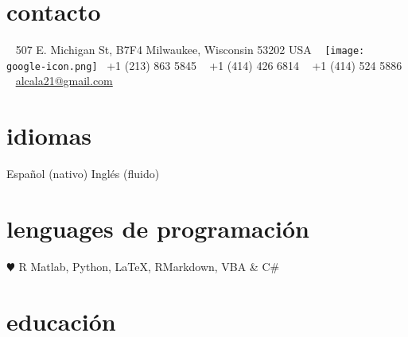 \documentclass[]{friggeri-cv} %
\begin{document}


\begin{aside} %
\section{contacto}
\Letter~ 507 E. Michigan St, B7F4
Milwaukee, Wisconsin 53202
USA
~
\texttt{[image: google-icon.png]}~ +1 (213) 863 5845
\Mobilefone~ +1 (414) 426 6814
\Telefon~ +1 (414) 524 5886
~
\href{mailto:alcala21@gmail.com}{alcala21@gmail.com}
\section{idiomas}
Español (nativo)
Inglés (fluido)
\section{lenguages de programación}
{\color{red} $\varheartsuit$} R
Matlab, Python,
\LaTeX, RMarkdown,
VBA \& C\#
\end{aside}


\section{educación}
\end{document}
